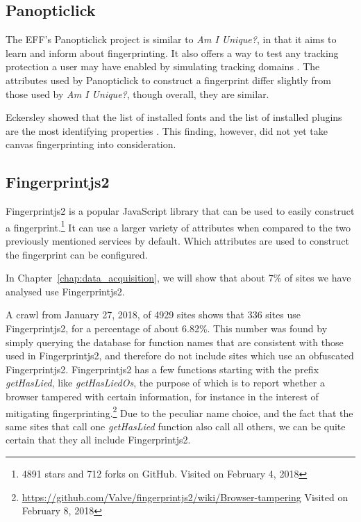 \documentclass[
    fontsize=12pt,
    headings=small,
    parskip=half,
    bibliography=totoc,
    numbers=noenddot,
    open=any
    ]{scrreprt}
\begin{document}
\subsection{Panopticlick}
\label{related_work:panopticlick}
The EFF's Panopticlick project is similar to \textit{Am I Unique?}, in that it aims to learn and inform about
fingerprinting. It also offers a way to test any tracking protection a user may have enabled by simulating
tracking domains \cite{panopticlick}. The attributes used by Panopticlick to construct a fingerprint differ slightly from those used by
\textit{Am I Unique?}, though overall, they are similar.

Eckersley showed that the list of installed fonts and the list of installed plugins are the most identifying properties
\cite{eckersley2010unique}. This finding, however, did not yet take canvas fingerprinting into consideration.


\subsection{Fingerprintjs2}
\label{related_work:fingerprintjs2}
Fingerprintjs2 \cite{fingerprintjs2} is a popular JavaScript library that
can be used to easily construct a fingerprint.\footnote{4891 stars and 712 forks on GitHub. Visited on February 4, 2018}
It can use a larger variety of attributes when compared to the two previously mentioned services by default.
Which attributes are used to construct the fingerprint can be configured.

In Chapter~\ref{chap:data_acquisition}, we will show that about 7\% of sites we have analysed use Fingerprintjs2.

A crawl from January 27, 2018, of 4929 sites shows that 336 sites use Fingerprintjs2, for a percentage of about 6.82\%.
This number was found by simply querying the database for function names that are consistent with
those used in Fingerprintjs2, and therefore do not include sites which use an obfuscated Fingerprintjs2.
Fingerprintjs2 has a few functions starting with the prefix \textit{getHasLied}, like \textit{getHasLiedOs}, the purpose
of which is to report whether a browser tampered with certain information, for instance in the interest of mitigating
fingerprinting.\footnote{\url{https://github.com/Valve/fingerprintjs2/wiki/Browser-tampering} Visited on February 8, 2018}
Due to the peculiar name choice, and the fact that the same sites that call one \textit{getHasLied}
function also call all others, we can be quite certain that they all include Fingerprintjs2.
\end{document}
